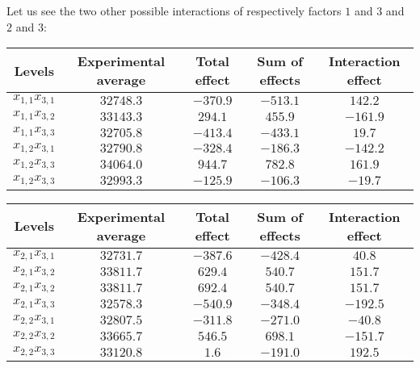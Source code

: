 	Let us see the two other possible interactions of respectively factors $1$ and $3$ and $2$ and $3$:
		\begin{table}[H]\centering
		\centering
		\begin{tabular}{|c|c|c|c|c|}
		\hline
		\multicolumn{1}{c}{\cellcolor{black!30}\textbf{Levels}} & 
	  	\multicolumn{1}{c}{\cellcolor{black!30}Experimental average} & 
	  	\multicolumn{1}{c}{\cellcolor{black!30}Total effect} & 
	  	\multicolumn{1}{c}{\cellcolor{black!30}Sum of effects} & 
	  	\multicolumn{1}{c}{\cellcolor{black!30}Interaction effect} \\ \hline
		$x_{1,1}x_{3,1}$ & $32748.3$ & $-370.9$ & $-513.1$ & $142.2$ \\ \hline
		$x_{1,1}x_{3,2}$ & $33143.3$ & $294.1$ & $455.9$ & $-161.9$ \\ \hline
		$x_{1,1}x_{3,3}$ & $32705.8$ & $-413.4$ & $-433.1$ & $19.7$ \\ \hline
		$x_{1,2}x_{3,1}$ & $32790.8$ & $-328.4$ & $-186.3$ & $-142.2$ \\ \hline
		$x_{1,2}x_{3,3}$ & $34064.0$ & $944.7$ & $782.8$ & $161.9$ \\ \hline
		$x_{1,2}x_{3,3}$ & $32993.3$ & $-125.9$ & $-106.3$ & $-19.7$ \\ \hline
	 	\end{tabular}
	\end{table}
	\begin{table}[H]\centering
		\centering
		\begin{tabular}{|c|c|c|c|c|}
		\hline
		\multicolumn{1}{c}{\cellcolor{black!30}\textbf{Levels}} & 
	  	\multicolumn{1}{c}{\cellcolor{black!30}Experimental average} & 
	  	\multicolumn{1}{c}{\cellcolor{black!30}Total effect} & 
	  	\multicolumn{1}{c}{\cellcolor{black!30}Sum of effects} & 
	  	\multicolumn{1}{c}{\cellcolor{black!30}Interaction effect} \\ \hline
		$x_{2,1}x_{3,1}$ & $32731.7$ & $-387.6$ & $-428.4$ & $40.8$ \\ \hline
		$x_{2,1}x_{3,2}$ & $33811.7$ & $629.4$ & $540.7$ & $151.7$ \\ \hline
		$x_{2,1}x_{3,2}$ & $33811.7$ & $692.4$ & $540.7$ & $151.7$ \\ \hline
		$x_{2,1}x_{3,3}$ & $32578.3$ & $-540.9$ & $-348.4$ & $-192.5$ \\ \hline
		$x_{2,2}x_{3,1}$ & $32807.5$ & $-311.8$ & $-271.0$ & $-40.8$ \\ \hline
		$x_{2,2}x_{3,2}$ & $33665.7$ & $546.5$ & $698.1$ & $-151.7$ \\ \hline
		$x_{2,2}x_{3,3}$ & $33120.8$ & $1.6$ & $-191.0$ & $192.5$ \\ \hline
	 	\end{tabular}
	\end{table}
